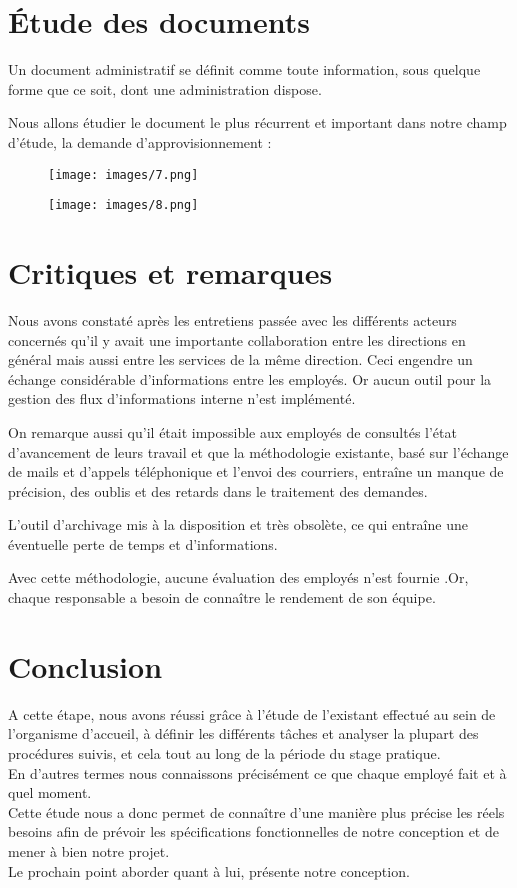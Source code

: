 \documentclass{report}
\begin{document}
\newpage
\section{Étude des documents}
Un document administratif se définit comme toute information, sous quelque forme que ce soit, dont une administration dispose.

Nous allons étudier le document le plus récurrent et important dans notre champ d’étude, la demande d’approvisionnement :
    
    \begin{figure}[h]
        \centering
            \texttt{[image: images/7.png]}
    \end{figure}
\vspace{0.4cm}
    \begin{figure}[h]
        \centering
            \texttt{[image: images/8.png]}
    \end{figure}
    
\newpage
\section{Critiques et remarques}
Nous avons constaté après les entretiens passée avec les différents acteurs concernés qu’il y avait une importante collaboration entre les directions en général mais aussi entre les services de la même direction. Ceci engendre un échange considérable d’informations entre les employés. Or aucun outil pour la gestion des flux d’informations interne n’est implémenté.

On remarque aussi qu’il était impossible aux employés de consultés l’état d’avancement de leurs travail et que la méthodologie existante, basé sur l’échange de mails et d’appels téléphonique et l'envoi des courriers, entraîne un manque de précision, des oublis et des retards dans le traitement des demandes.

L’outil d’archivage mis à la disposition et très obsolète, ce qui entraîne une éventuelle perte de temps et d’informations.

Avec cette méthodologie, aucune évaluation des employés n’est fournie .Or, chaque responsable a besoin de connaître le rendement de son équipe.
\vspace*{1cm}
\section{Conclusion}
A cette étape, nous avons réussi grâce à l’étude de l'existant effectué au sein de l'organisme d’accueil, à définir les différents tâches et analyser la plupart des procédures suivis, et cela tout au long de la période du stage pratique.\\
En d’autres termes nous connaissons précisément ce que chaque employé fait et à quel moment.\\ Cette étude nous a donc permet de connaître  d’une manière plus précise les réels besoins afin de prévoir les spécifications fonctionnelles de notre conception et de mener à bien notre projet.\\ 
Le prochain point aborder quant à lui, présente notre conception.
\end{document}
